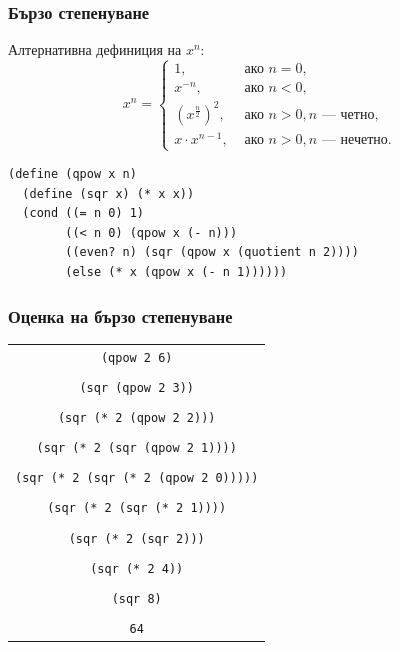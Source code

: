 \documentclass{beamer}
\begin{document}
\begin{frame}[fragile]
  \frametitle{Бързо степенуване}

  Алтернативна дефиниция на $x^n$:
  \begin{equation*}
    x^n = \begin{cases}
      1,&\text{ ако }n = 0,\\
      x^{-n},&\text{ ако }n < 0,\\
      (x^{\frac n2})^2,&\text{ ако }n > 0, n\text{ --- четно},\\
      x\cdot x^{n-1},&\text{ ако }n > 0, n\text{ --- нечетно}.
    \end{cases}
  \end{equation*}

  \pause

\begin{verbatim}
(define (qpow x n)
  (define (sqr x) (* x x))
  (cond ((= n 0) 1)
        ((< n 0) (qpow x (- n)))
        ((even? n) (sqr (qpow x (quotient n 2))))
        (else (* x (qpow x (- n 1))))))
\end{verbatim}
\end{frame}

\begin{frame}
  \frametitle{Оценка на бързо степенуване}

  \begin{center}
    \scriptsize
    \begin{tabular}{c}
      \tt{(qpow 2 6)}\\
      \nxt{\bda\\
      \tt{(sqr (qpow 2 3))}\\
      \nxt{\bda\\
      \tt{(sqr (* 2 (qpow 2 2)))}\\
      \nxt{\bda\\
      \tt{(sqr (* 2 (sqr (qpow 2 1))))}\\
      \nxt{\bda\\
      \tt{(sqr (* 2 (sqr (* 2 (qpow 2 0)))))}\\
      \nxt{\bda\\
      \tt{(sqr (* 2 (sqr (* 2 1))))}\\
      \nxt{\bda\\
      \tt{(sqr (* 2 (sqr 2)))}\\
      \nxt{\bda\\
      \tt{(sqr (* 2 4))}\\
      \nxt{\bda\\
      \tt{(sqr 8)}\\
      \nxt{\bda\\
      \tt{64}}}}}}}}}}
    \end{tabular}
  \end{center}

\end{frame}
\end{document}
